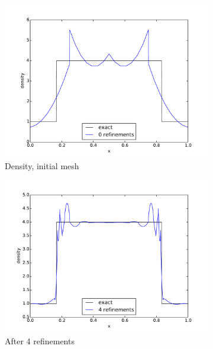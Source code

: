 \documentclass[preprint,12pt]{elsarticle}
\begin{document}
\begin{figure}[p]
\centering
\begin{subfigure}[c]{0.3\textwidth}
\centering
\includegraphics[width=\textwidth]{SpaceTimeCNS/Noh1e-3/den1.pdf}
\caption{Density, initial mesh}
\label{fig:noh_den0}
\end{subfigure}
\begin{subfigure}[c]{0.3\textwidth}
\centering
\includegraphics[width=\textwidth]{SpaceTimeCNS/Noh1e-3/den5.pdf}
\caption{After 4 refinements}
\label{fig:noh_den4}
\end{subfigure}
\begin{subfigure}[c]{0.3\textwidth}
\centering

\end{subfigure}
\end{figure}
\end{document}

